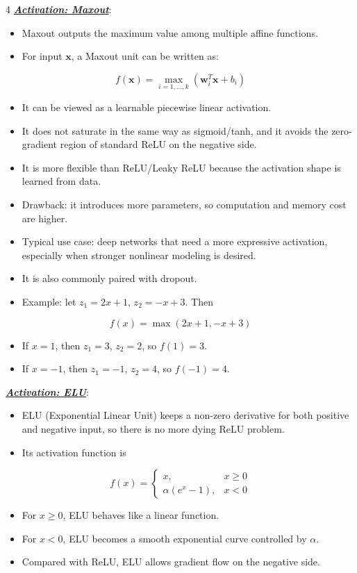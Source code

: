 \documentclass[12pt]{article}
\newcommand{\bulletPoint}[1]{\ul{\textit{\textbf{#1}}}}
\begin{document}
\begin{multicols*}{4}
\bulletPoint{Activation: Maxout}:
\begin{itemize}
\item Maxout outputs the maximum value among multiple affine functions.
\item For input $\mathbf{x}$, a Maxout unit can be written as:
\end{itemize}
\useshortskip
\begin{equation*}
    f(\mathbf{x})=\max_{i=1,\ldots,k}(\mathbf{w}_i^T\mathbf{x}+b_i)
\end{equation*}
\begin{itemize}
\item It can be viewed as a learnable piecewise linear activation.
\item It does not saturate in the same way as sigmoid/tanh, and it avoids the zero-gradient region of standard ReLU on the negative side.
\item It is more flexible than ReLU/Leaky ReLU because the activation shape is learned from data.
\item Drawback: it introduces more parameters, so computation and memory cost are higher.
\item Typical use case: deep networks that need a more expressive activation, especially when stronger nonlinear modeling is desired.
\item It is also commonly paired with dropout.
\item Example: let $z_1=2x+1$, $z_2=-x+3$. Then
\end{itemize}
\useshortskip
\begin{equation*}
    f(x)=\max(2x+1,-x+3)
\end{equation*}
\begin{itemize}
\item If $x=1$, then $z_1=3$, $z_2=2$, so $f(1)=3$.
\item If $x=-1$, then $z_1=-1$, $z_2=4$, so $f(-1)=4$.
\end{itemize}

\bulletPoint{Activation: ELU}:
\begin{itemize}
\item ELU (Exponential Linear Unit) keeps a non-zero derivative for both positive and negative input, so there is no more dying ReLU problem.
\item Its activation function is
\end{itemize}
\useshortskip
\begin{equation*}
    f(x)=
    \begin{cases}
        x, & x\geq 0\\
        \alpha(e^x-1), & x<0
    \end{cases}
\end{equation*}
\begin{itemize}
\item For $x\ge 0$, ELU behaves like a linear function.
\item For $x<0$, ELU becomes a smooth exponential curve controlled by $\alpha$.
\item Compared with ReLU, ELU allows gradient flow on the negative side.
\end{itemize}


\end{multicols*}
\end{document}
